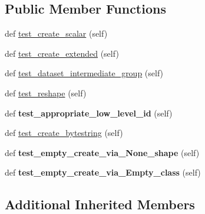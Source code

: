 \subsection*{Public Member Functions}
\begin{DoxyCompactItemize}
\item 
def \hyperlink{classh5py__LOCAL_1_1tests_1_1old_1_1test__dataset_1_1TestCreateData_aa940a25ce0c4a9a20116daabd04e0f05}{test\+\_\+create\+\_\+scalar} (self)
\item 
def \hyperlink{classh5py__LOCAL_1_1tests_1_1old_1_1test__dataset_1_1TestCreateData_a8434c8dd0687c9c4139391e3dac32358}{test\+\_\+create\+\_\+extended} (self)
\item 
def \hyperlink{classh5py__LOCAL_1_1tests_1_1old_1_1test__dataset_1_1TestCreateData_a54df83ff762b83656f6c60d6953a6c11}{test\+\_\+dataset\+\_\+intermediate\+\_\+group} (self)
\item 
def \hyperlink{classh5py__LOCAL_1_1tests_1_1old_1_1test__dataset_1_1TestCreateData_a9e3e29014bfe53869669535afe2c88a6}{test\+\_\+reshape} (self)
\item 
\mbox{\label{classh5py__LOCAL_1_1tests_1_1old_1_1test__dataset_1_1TestCreateData_ae126272aa9536bc7242b16208c60fd86}} 
def {\bfseries test\+\_\+appropriate\+\_\+low\+\_\+level\+\_\+id} (self)
\item 
def \hyperlink{classh5py__LOCAL_1_1tests_1_1old_1_1test__dataset_1_1TestCreateData_a331d76565eb3c49fbefe7afd7b3d9f5f}{test\+\_\+create\+\_\+bytestring} (self)
\item 
\mbox{\label{classh5py__LOCAL_1_1tests_1_1old_1_1test__dataset_1_1TestCreateData_ac6bf5e894616057a1d246f25e71bef68}} 
def {\bfseries test\+\_\+empty\+\_\+create\+\_\+via\+\_\+\+None\+\_\+shape} (self)
\item 
\mbox{\label{classh5py__LOCAL_1_1tests_1_1old_1_1test__dataset_1_1TestCreateData_a12a9c7d1189d02ed6b4716c90c77feb6}} 
def {\bfseries test\+\_\+empty\+\_\+create\+\_\+via\+\_\+\+Empty\+\_\+class} (self)
\end{DoxyCompactItemize}
\subsection*{Additional Inherited Members}


